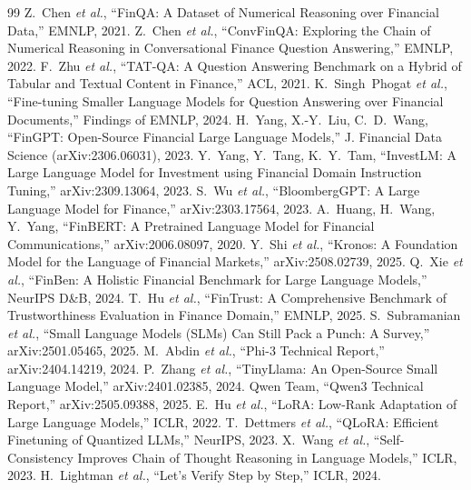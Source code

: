 \documentclass[10pt]{article}
\begin{document}
\small
\begin{thebibliography}{99}
 Z.~Chen \emph{et al.}, ``FinQA: A Dataset of Numerical Reasoning over Financial Data,'' EMNLP, 2021.
 Z.~Chen \emph{et al.}, ``ConvFinQA: Exploring the Chain of Numerical Reasoning in Conversational Finance Question Answering,'' EMNLP, 2022.
 F.~Zhu \emph{et al.}, ``TAT-QA: A Question Answering Benchmark on a Hybrid of Tabular and Textual Content in Finance,'' ACL, 2021.
 K.~Singh~Phogat \emph{et al.}, ``Fine-tuning Smaller Language Models for Question Answering over Financial Documents,'' Findings of EMNLP, 2024.
 H.~Yang, X.-Y.~Liu, C.~D.~Wang, ``FinGPT: Open-Source Financial Large Language Models,'' J. Financial Data Science (arXiv:2306.06031), 2023.
 Y.~Yang, Y.~Tang, K.~Y.~Tam, ``InvestLM: A Large Language Model for Investment using Financial Domain Instruction Tuning,'' arXiv:2309.13064, 2023.
 S.~Wu \emph{et al.}, ``BloombergGPT: A Large Language Model for Finance,'' arXiv:2303.17564, 2023.
 A.~Huang, H.~Wang, Y.~Yang, ``FinBERT: A Pretrained Language Model for Financial Communications,'' arXiv:2006.08097, 2020.
 Y.~Shi \emph{et al.}, ``Kronos: A Foundation Model for the Language of Financial Markets,'' arXiv:2508.02739, 2025.
 Q.~Xie \emph{et al.}, ``FinBen: A Holistic Financial Benchmark for Large Language Models,'' NeurIPS D\&B, 2024.
 T.~Hu \emph{et al.}, ``FinTrust: A Comprehensive Benchmark of Trustworthiness Evaluation in Finance Domain,'' EMNLP, 2025.
 S.~Subramanian \emph{et al.}, ``Small Language Models (SLMs) Can Still Pack a Punch: A Survey,'' arXiv:2501.05465, 2025.
 M.~Abdin \emph{et al.}, ``Phi-3 Technical Report,'' arXiv:2404.14219, 2024.
 P.~Zhang \emph{et al.}, ``TinyLlama: An Open-Source Small Language Model,'' arXiv:2401.02385, 2024.
 Qwen Team, ``Qwen3 Technical Report,'' arXiv:2505.09388, 2025.
 E.~Hu \emph{et al.}, ``LoRA: Low-Rank Adaptation of Large Language Models,'' ICLR, 2022.
 T.~Dettmers \emph{et al.}, ``QLoRA: Efficient Finetuning of Quantized LLMs,'' NeurIPS, 2023.
 X.~Wang \emph{et al.}, ``Self-Consistency Improves Chain of Thought Reasoning in Language Models,'' ICLR, 2023.
 H.~Lightman \emph{et al.}, ``Let's Verify Step by Step,'' ICLR, 2024.

\end{thebibliography}
\end{document}
